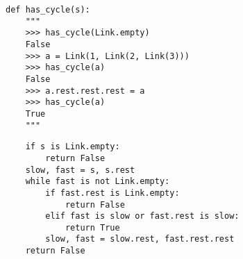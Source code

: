 \documentclass{exam}
\begin{document}
\begin{questions}
\begin{blocksection}
\begin{lstlisting}
def has_cycle(s):
    """
    >>> has_cycle(Link.empty)
    False
    >>> a = Link(1, Link(2, Link(3)))
    >>> has_cycle(a)
    False
    >>> a.rest.rest.rest = a
    >>> has_cycle(a)
    True
    """
\end{lstlisting}

\begin{solution}
\begin{lstlisting}
    if s is Link.empty:
        return False
    slow, fast = s, s.rest
    while fast is not Link.empty:
        if fast.rest is Link.empty:
            return False
        elif fast is slow or fast.rest is slow:
            return True
        slow, fast = slow.rest, fast.rest.rest
    return False
\end{lstlisting}
\end{solution}

\end{blocksection}

\end{questions}

\end{document}
